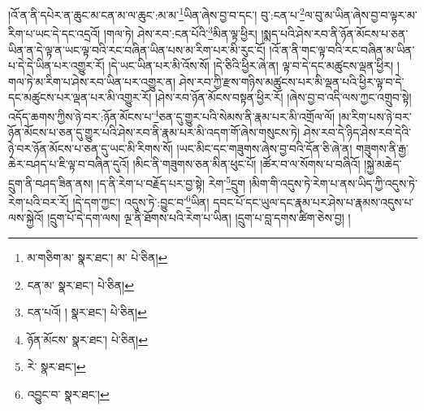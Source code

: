 །འོ་ན་ནི་དཔེར་ན་ཆུང་མ་ངན་མ་ལ་ཆུང་:མ་མ་\footnote{མ་གཅིག་མ་  སྣར་ཐང་། མ་  པེ་ཅིན། }ཡིན་ཞེས་བྱ་བ་དང་། བུ་:ངན་པ་\footnote{ངན་མ་  སྣར་ཐང་།  པེ་ཅིན། }ལ་བུ་མ་ཡིན་ཞེས་བྱ་བ་ལྟར་མ་རིག་པ་ཡང་དེ་དང་འདྲའོ། །གལ་ཏེ། ཤེས་རབ་:ངན་པོའི་\footnote{ངན་པའོ། །  སྣར་ཐང་།  པེ་ཅིན། }མིན་ལྟ་ཕྱིར། །སྨད་པའི་ཤེས་རབ་ནི་ཉོན་མོངས་པ་ཅན་ཡིན་ན་དེ་ལྟ་ན་ཡང་ལྟ་བའི་རང་བཞིན་ཡིན་པས་མ་རིག་པར་མི་རུང་ངོ། །འོ་ན་ནི་གང་ལྟ་བའི་རང་བཞིན་མ་ཡིན་པ་དེ་དེ་ཡིན་པར་འགྱུར་རོ། །དེ་ཡང་ཡིན་པར་མི་འོས་སོ། །དེ་ཅིའི་ཕྱིར་ཞེ་ན། ལྟ་བ་དེ་དང་མཚུངས་ལྡན་ཕྱིར། །གལ་ཏེ་མ་རིག་པ་ཤེས་རབ་ཡིན་པར་འགྱུར་ན། ཤེས་རབ་ཀྱི་རྫས་གཉིས་མཚུངས་པར་མི་ལྡན་པའི་ཕྱིར་ལྟ་བ་དེ་དང་མཚུངས་པར་ལྡན་པར་མི་འགྱུར་རོ། །ཤེས་རབ་ཉོན་མོངས་བསྟན་ཕྱིར་རོ། །ཞེས་བྱ་བ་འདི་ལས་ཀྱང་འགྲུབ་སྟེ། འདོད་ཆགས་ཀྱིས་ཉེ་བར་:ཉོན་མོངས་པ་\footnote{ཉོན་མོངས་  སྣར་ཐང་།  པེ་ཅིན། }ཅན་དུ་གྱུར་པའི་སེམས་ནི་རྣམ་པར་མི་འགྲོལ་ལོ། །མ་རིག་པས་ཉེ་བར་ཉོན་མོངས་པ་ཅན་དུ་གྱུར་པའི་ཤེས་རབ་ནི་རྣམ་པར་མི་འདག་གོ་ཞེས་གསུངས་ཏེ། ཤེས་རབ་དེ་ཉིད་ཤེས་རབ་དེའི་ཉེ་བར་ཉོན་མོངས་པ་ཅན་དུ་ཡང་མི་རིགས་སོ། །ཡང་མིང་དང་གཟུགས་ཞེས་བྱ་བའི་དོན་ཅི་ཞེ་ན། གཟུགས་ནི་རྒྱ་ཆེར་བཤད་པ་ཇི་ལྟ་བ་བཞིན་དུའོ། །མིང་ནི་གཟུགས་ཅན་མིན་ཕུང་པོ། །ཚོར་བ་ལ་སོགས་པ་བཞིའོ། །སྐྱེ་མཆེད་དྲུག་ནི་བཤད་ཟིན་ནས། །ད་ནི་རེག་པ་བརྗོད་པར་བྱ་སྟེ། རེག་\footnote{རེ་  སྣར་ཐང་། }དྲུག །མིག་གི་འདུས་ཏེ་རེག་པ་ནས་ཡིད་ཀྱི་འདུས་ཏེ་རེག་པའི་བར་རོ། །དེ་དག་ཀྱང་། འདུས་ཏེ་:བྱུང་བ་\footnote{འབྱུང་བ་  སྣར་ཐང་། }ཡིན། དབང་པོ་དང་ཡུལ་དང་རྣམ་པར་ཤེས་པ་རྣམས་འདུས་པ་ལས་སྐྱེའོ། །དྲུག་པོ་དེ་དག་ལས། ལྔ་ནི་ཐོགས་པའི་རེག་པ་ཡིན། །དྲུག་པ་བླ་དགས་ཚིག་ཅེས་བྱ། །

